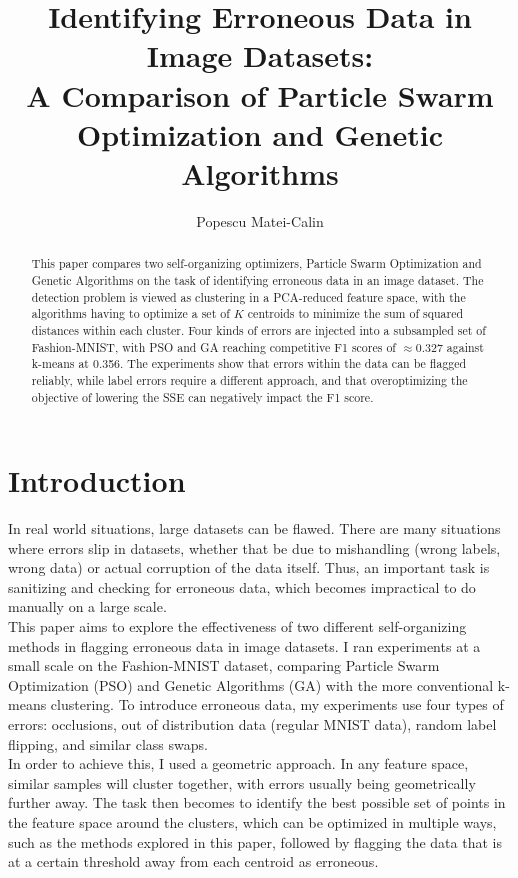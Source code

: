 \documentclass[11pt,a4paper]{article}
\title{Identifying Erroneous Data in Image Datasets:\\
A Comparison of Particle Swarm Optimization and Genetic Algorithms}
\author{Popescu Matei-Calin}
\begin{document}
\maketitle

\begin{abstract}
This paper compares two self-organizing optimizers, Particle Swarm Optimization and Genetic Algorithms on the task of identifying erroneous data in an image dataset. The detection problem is viewed as clustering in a PCA-reduced feature space, with the algorithms having to optimize a set of $K$ centroids to minimize the sum of squared distances within each cluster. Four kinds of errors are injected into a subsampled set of Fashion-MNIST, with PSO and GA reaching competitive F1 scores of $\approx$0.327 against k-means at 0.356. The experiments show that errors within the data can be flagged reliably, while label errors require a different approach, and that overoptimizing the objective of lowering the SSE can negatively impact the F1 score. 
\end{abstract}

\section{Introduction}

In real world situations, large datasets can be flawed. There are many situations where errors slip in datasets, whether that be due to mishandling (wrong labels, wrong data) or actual corruption of the data itself. Thus, an important task is sanitizing and checking for erroneous data, which becomes impractical to do manually on a large scale. \\

This paper aims to explore the effectiveness of two different self-organizing methods in flagging erroneous data in image datasets. I ran experiments at a small scale on the Fashion-MNIST dataset, comparing Particle Swarm Optimization (PSO) and Genetic Algorithms (GA) with the more conventional k-means clustering. To introduce erroneous data, my experiments use four types of errors: occlusions, out of distribution data (regular MNIST data), random label flipping, and similar class swaps. \\

In order to achieve this, I used a geometric approach. In any feature space, similar samples will cluster together, with errors usually being geometrically further away. The task then becomes to identify the best possible set of points in the feature space around the clusters, which can be optimized in multiple ways, such as the methods explored in this paper, followed by flagging the data that is at a certain threshold away from each centroid as erroneous. \\
\end{document}
